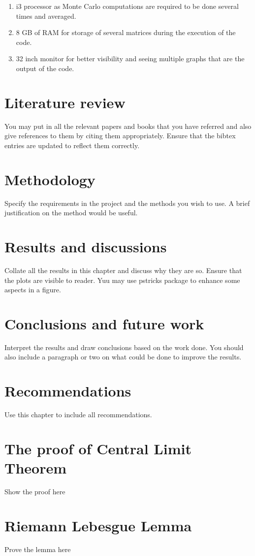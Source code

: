 \documentclass{book}
\begin{document}
\begin{enumerate}
\item i3 processor as Monte Carlo computations are required to be done several times and averaged.  
\item 8 GB of RAM for storage of several matrices during the execution of the code. 
\item 32 inch monitor for better visibility and seeing multiple graphs that are the output of the code.
\end{enumerate}





\chapter{Literature review}
You may put in all the relevant papers and books that you have referred and also give references to them by citing them appropriately. Ensure that the bibtex entries are updated to reflect them correctly. 
\chapter{Methodology}
Specify the requirements in the project and the methods you wish to use. A brief justification on the method would be useful. 
\chapter{Results and discussions}
Collate all the results in this chapter and discuss why they are so. Ensure that the plots are visible to reader. Yuu may use pstricks package to enhance some aspects in a figure. 
\chapter{Conclusions and future work}
Interpret the results and draw conclusions based on the work done. You should also include a paragraph or two on what could be done to improve the results. 

\chapter{Recommendations}
Use this chapter to include all recommendations.


\begin{appendices}
\chapter{The proof of Central Limit Theorem}
Show the proof here
\chapter{Riemann Lebesgue Lemma}
	\label{appB}
Prove the lemma here
\end{appendices}
\end{document}
